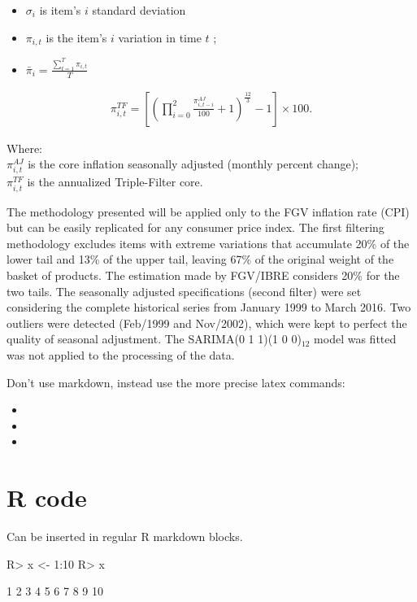 \documentclass[article]{jss}
\providecommand{\tightlist}{%
  \setlength{\itemsep}{0pt}\setlength{\parskip}{0pt}}
\begin{document}
\begin{itemize}
\tightlist
\item
  \(\sigma_i\) is item's \(i\) standard deviation
\item
  \(\pi_{i,t}\) is the item's \(i\) variation in time \(t\) ;
\item
  \(\bar{\pi}_{i} = \frac{\sum_{t=1}^{T}{\pi_{i,t}}}{T}\)
\end{itemize}

\begin{align}\label{equacao_mm3}
\pi_{i,t}^{TF} = \left [\left (\prod_{i=0}^{2} \frac{\pi_{i,t-i}^{AJ}}{100} + 1  \right )^{\frac{12}{3}} -1 \right ] \times 100.
\end{align}

\noindent
Where:\\
\(\pi_{i,t}^{AJ}\) is the core inflation seasonally adjusted (monthly
percent change);\\
\(\pi_{i,t}^{TF}\) is the annualized Triple-Filter core.\vspace{0.3cm}

The methodology presented will be applied only to the FGV inflation rate
(CPI) but can be easily replicated for any consumer price index. The
first filtering methodology excludes items with extreme variations that
accumulate 20\% of the lower tail and 13\% of the upper tail, leaving
67\% of the original weight of the basket of products. The estimation
made by FGV/IBRE considers 20\% for the two tails. The seasonally
adjusted specifications (second filter) were set considering the
complete historical series from January 1999 to March 2016. Two outliers
were detected (Feb/1999 and Nov/2002), which were kept to perfect the
quality of seasonal adjustment. The SARIMA(0 1 1)(1 0 0)\(_{12}\) model
was fitted was not applied to the processing of the data.

Don't use markdown, instead use the more precise latex commands:

\begin{itemize}
\tightlist
\item
\item
\item
\end{itemize}

\section{R code}\label{r-code}

Can be inserted in regular R markdown blocks.

\begin{CodeChunk}

\begin{CodeInput}
R> x <- 1:10
R> x
\end{CodeInput}

\begin{CodeOutput}
 [1]  1  2  3  4  5  6  7  8  9 10
\end{CodeOutput}
\end{CodeChunk}


\end{document}
